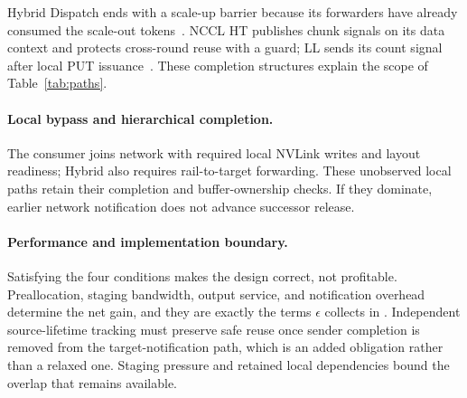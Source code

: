 Hybrid Dispatch ends with a scale-up barrier because its forwarders have already consumed the scale-out tokens~\cite{deepepcode}. NCCL HT publishes chunk signals on its data context and protects cross-round reuse with a guard; LL sends its count signal after local PUT issuance~\cite{ncclhtcode,ncclllcode}. These completion structures explain the scope of Table~\ref{tab:paths}.

\paragraph{Local bypass and hierarchical completion.}
The consumer joins network \done{} with required local NVLink writes and layout readiness; Hybrid also requires rail-to-target forwarding. These unobserved local paths retain their completion and buffer-ownership checks. If they dominate, earlier network notification does not advance successor release.

\paragraph{Performance and implementation boundary.}
Satisfying the four conditions makes the design correct, not profitable. Preallocation, staging bandwidth, output service, and notification overhead determine the net gain, and they are exactly the terms $\epsilon$ collects in . Independent source-lifetime tracking must preserve safe reuse once sender completion is removed from the target-notification path, which is an added obligation rather than a relaxed one. Staging pressure and retained local dependencies bound the overlap that remains available.
